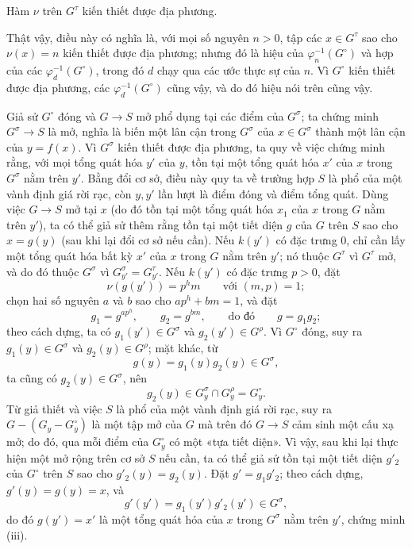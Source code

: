  Hàm $\nu$ trên $G^\tau$ kiến thiết được địa phương.

Thật vậy, điều này có nghĩa là, với mọi số nguyên $n>0$, tập các
$x\in G^\tau$ sao cho $\nu(x)=n$ kiến thiết được địa phương; nhưng đó là hiệu
của $\varphi_n^{-1}(G^\circ)$ và hợp của các
$\varphi_d^{-1}(G^\circ)$, trong đó $d$ chạy qua các ước thực sự của $n$. Vì
$G^\circ$ kiến thiết được địa phương, các $\varphi_d^{-1}(G^\circ)$ cũng vậy,
và do đó hiệu nói trên cũng vậy.

Giả sử $G^\circ$ đóng và $G\longrightarrow S$ mở phổ dụng tại các điểm của
$G^\sigma$; ta chứng minh $G^\sigma\longrightarrow S$ là mở, nghĩa là biến
một lân cận trong $G^\sigma$ của $x\in G^\sigma$ thành một lân cận của
$y=f(x)$. Vì $G^\sigma$ kiến thiết được địa phương, ta quy về việc chứng minh
rằng, với mọi tổng quát hóa $y'$ của $y$, tồn tại một tổng quát hóa $x'$ của
$x$ trong $G^\sigma$ nằm trên $y'$. Bằng đổi cơ sở, điều này quy ta về trường
hợp $S$ là phổ của một vành định giá rời rạc, còn $y,y'$ lần lượt là điểm đóng
và điểm tổng quát. Dùng việc $G\longrightarrow S$ mở tại $x$ (do đó tồn tại
một tổng quát hóa $x_1$ của $x$ trong $G$ nằm trên $y'$), ta có thể giả sử
thêm rằng tồn tại một tiết diện $g$ của $G$ trên $S$ sao cho $x=g(y)$ (sau
khi lại đổi cơ sở nếu cần). Nếu $k(y')$ có đặc trưng 0, chỉ cần lấy một tổng
quát hóa bất kỳ $x'$ của $x$ trong $G$ nằm trên $y'$; nó thuộc $G^\tau$ vì
$G^\tau$ mở, và do đó thuộc $G^\sigma$ vì
$G_{y'}^\sigma=G_{y'}^\tau$. Nếu $k(y')$ có đặc trưng $p>0$, đặt
\[
\nu(g(y'))=p^hm\qquad\text{với }(m,p)=1 ;
\]
chọn hai số nguyên $a$ và $b$ sao cho $ap^h+bm=1$, và đặt
\[
g_1=g^{ap^h},\qquad g_2=g^{bm},\qquad\text{do đó}\qquad g=g_1g_2 ;
\]
theo cách dựng, ta có $g_1(y')\in G^\sigma$ và
$g_2(y')\in G^\rho$. Vì $G^\circ$ đóng, suy ra
$g_1(y)\in G^\sigma$ và $g_2(y)\in G^\rho$; mặt khác, từ
\[
g(y)=g_1(y)g_2(y)\in G^\sigma,
\]
ta cũng có $g_2(y)\in G^\sigma$, nên
\[
g_2(y)\in G_y^\sigma\cap G_y^\rho=G_y^\circ.
\]
Từ giả thiết và việc $S$ là phổ của một vành định giá rời rạc, suy ra
$G-(G_y-G_y^\circ)$ là một tập mở của $G$ mà trên đó
$G\longrightarrow S$ cảm sinh một cấu xạ mở; do đó, qua mỗi điểm của
$G_y^\circ$ có một «tựa tiết diện». Vì vậy, sau khi lại thực hiện một mở rộng
trên cơ sở $S$ nếu cần, ta có thể giả sử tồn tại một tiết diện $g'_2$ của
$G^\circ$ trên $S$ sao cho $g'_2(y)=g_2(y)$. Đặt $g'=g_1g'_2$; theo cách dựng,
$g'(y)=g(y)=x$, và
\[
g'(y')=g_1(y')g'_2(y')\in G^\sigma,
\]
do đó $g(y')=x'$ là một tổng quát hóa
của $x$ trong $G^\sigma$ nằm trên $y'$, chứng minh (iii).


